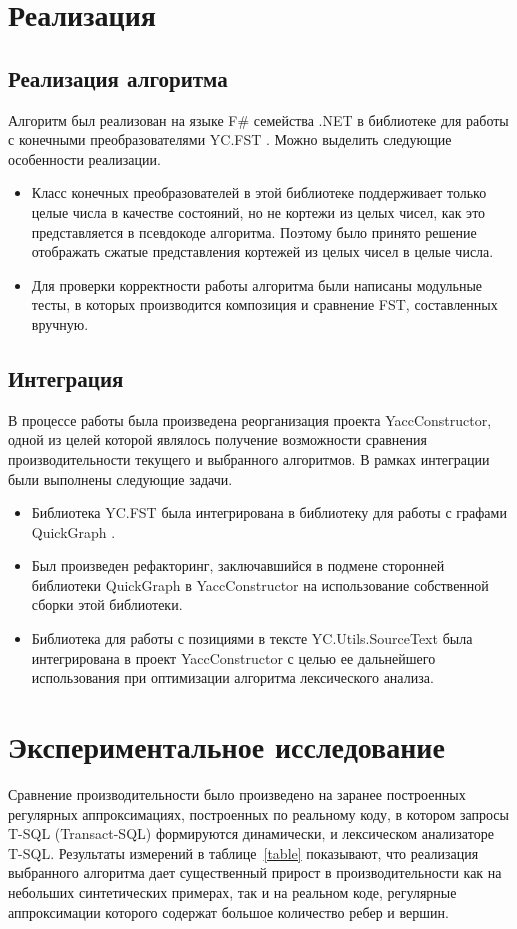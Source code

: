 \section{Реализация}
\subsection{Реализация алгоритма}
Алгоритм был реализован на языке F\# семейства .NET в библиотеке для работы с конечными преобразователями YC.FST \cite{polubelova}. Можно выделить следующие особенности реализации.
\begin{itemize}
\item Класс конечных преобразователей в этой библиотеке поддерживает только целые числа в качестве состояний, но не кортежи из целых чисел, как это представляется в псевдокоде алгоритма. Поэтому было принято решение отображать сжатые представления кортежей из целых чисел в целые числа.
\item Для проверки корректности работы алгоритма были написаны модульные тесты, в которых производится композиция и сравнение FST, составленных вручную.
\end{itemize} 


\subsection{Интеграция}
В процессе работы была произведена реорганизация проекта YaccConstructor, одной из целей которой являлось получение возможности сравнения производительности текущего и выбранного алгоритмов. В рамках интеграции были выполнены следующие задачи.

\begin{itemize}
\item Библиотека YC.FST была интегрирована в библиотеку для работы с графами QuickGraph \cite{quick_graph}.
\item Был произведен рефакторинг, заключавшийся в подмене сторонней библиотеки QuickGraph в YaccConstructor на использование собственной сборки этой библиотеки.
\item Библиотека для работы с позициями в тексте YC.Utils.SourceText \cite{source_text} была интегрирована в проект YaccConstructor с целью ее дальнейшего использования при оптимизации алгоритма лексического анализа.
\end{itemize} 

\section{Экспериментальное исследование}
Сравнение производительности было произведено на заранее построенных регулярных аппроксимациях, построенных по реальному коду, в котором запросы T-SQL (Transact-SQL) формируются динамически, и лексическом анализаторе T-SQL. Результаты измерений в таблице~\ref{table} показывают, что реализация выбранного алгоритма дает существенный прирост в производительности как на небольших синтетических примерах, так и на реальном коде, регулярные аппроксимации которого содержат большое количество ребер и вершин.

